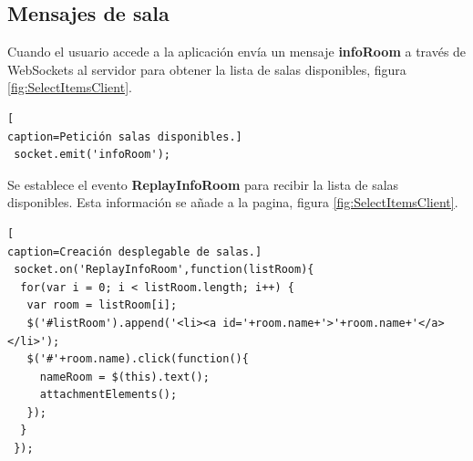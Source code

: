 \subsection*{Mensajes de sala}
Cuando el usuario accede a la aplicación envía un mensaje \textbf{infoRoom} a través de WebSockets al servidor para obtener la lista de salas disponibles, figura \ref{fig:SelectItemsClient}.
\begin{lstlisting}[
caption=Petición salas disponibles.]
 socket.emit('infoRoom');
\end{lstlisting}
Se establece el evento \textbf{ReplayInfoRoom} para recibir la lista de salas disponibles. Esta información se añade a la pagina, figura \ref{fig:SelectItemsClient}.
\begin{lstlisting}[
caption=Creación desplegable de salas.]
 socket.on('ReplayInfoRoom',function(listRoom){
  for(var i = 0; i < listRoom.length; i++) {
   var room = listRoom[i];
   $('#listRoom').append('<li><a id='+room.name+'>'+room.name+'</a></li>');
   $('#'+room.name).click(function(){
     nameRoom = $(this).text();
     attachmentElements();
   });
  }
 });
\end{lstlisting}
